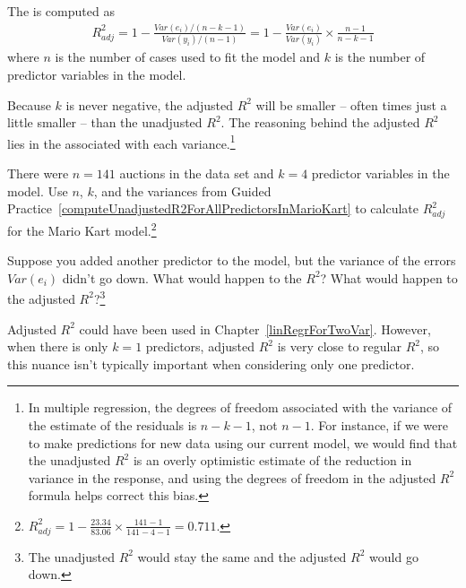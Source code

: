 \begin{termBox}{
The  is computed as
\begin{align*}
R_{adj}^{2} = 1-\frac{Var(e_i) / (n-k-1)}{Var(y_i) / (n-1)}
	= 1-\frac{Var(e_i)}{Var(y_i)} \times \frac{n-1}{n-k-1}
\end{align*}
where $n$ is the number of cases used to fit the model and $k$ is the number of predictor variables in the model.}
\end{termBox}

Because $k$ is never negative, the adjusted $R^2$ will be smaller -- often times just a little smaller -- than the unadjusted $R^2$. The reasoning behind the adjusted $R^2$ lies in the  associated with each variance.\footnote{In multiple regression, the degrees of freedom associated with the variance of the estimate of the residuals is $n-k-1$, not $n-1$. For instance, if we were to make predictions for new data using our current model, we would find that the unadjusted $R^2$ is an overly optimistic estimate of the reduction in variance in the response, and using the degrees of freedom in the adjusted $R^2$ formula helps correct this bias.}

\begin{exercise}
There were $n=141$ auctions in the  data set and $k=4$ predictor variables in the model. Use $n$, $k$, and the variances from Guided Practice~\ref{computeUnadjustedR2ForAllPredictorsInMarioKart} to calculate $R_{adj}^2$ for the Mario Kart model.\footnote{$R_{adj}^2 = 1 - \frac{23.34}{83.06}\times \frac{141-1}{141-4-1} = 0.711$.}
\end{exercise}

\begin{exercise}
Suppose you added another predictor to the model, but the variance of the errors $Var(e_i)$ didn't go down. What would happen to the $R^2$? What would happen to the adjusted $R^2$?\hspace{0.7mm}\footnote{The unadjusted $R^2$ would stay the same and the adjusted $R^2$ would go down.}
\end{exercise}

Adjusted $R^2$ could have been used in Chapter~\ref{linRegrForTwoVar}. However, when there is only $k = 1$ predictors, adjusted $R^2$ is very close to regular $R^2$, so this nuance isn't typically important when considering only one predictor.

